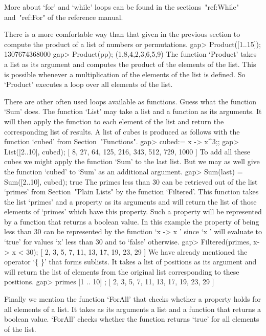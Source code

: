More about `for' and `while' loops can be found in the
sections~"ref:While" and~"ref:For" of the reference manual.


There is a more comfortable way than that given in the previous section to
compute the product of a list of numbers or permutations.
\beginexample
gap> Product([1..15]);
1307674368000
gap> Product(pp);
(1,8,4,2,3,6,5,9)
\endexample
The function  `Product'  takes a  list as  its argument and computes  the
product  of  the  elements  of the  list.   This  is possible whenever  a
multiplication of  the elements of the list is defined.  So  `Product' 
executes a loop over all elements of the list.

There are other often used loops available as functions.   Guess what the
function `Sum' does.  The function `List' may  take a list and a function
as its arguments.  It will then apply the function to each element of the
list  and return  the corresponding list of results.   A list of cubes is
produced as follows with the function `cubed' from Section~"Functions".
\beginexample
gap> cubed:= x -> x^3;;
gap> List([2..10], cubed);
[ 8, 27, 64, 125, 216, 343, 512, 729, 1000 ]
\endexample
To add all these cubes  we might apply the  function  `Sum' to  the  last
list.  But we may  as well  give the  function  `cubed' to  `Sum'  as  an
additional argument.
\beginexample
gap> Sum(last) = Sum([2..10], cubed);
true
\endexample
The  primes less than 30 can  be retrieved out  of the list `primes' from
Section~"Plain Lists" by the function `Filtered'. This function takes the
list `primes' and a property as its arguments and will return the list of
those elements of `primes' which have this property. Such a property will
be represented  by  a function  that  returns  a boolean  value. In  this
example the property  of  being less than  30 can be represented  by  the
function `x  -> x ' since `x ' will evaluate to `true'  for
values `x' less than 30 and to `false' otherwise.
\beginexample
gap> Filtered(primes, x-> x < 30);
[ 2, 3, 5, 7, 11, 13, 17, 19, 23, 29 ]
\endexample
We have already  mentioned the operator `\{  \}' that  forms sublists. It
takes a  list of positions  as its argument  and will return  the list of
elements from the original list corresponding to these positions.
\beginexample
gap> primes{ [1 .. 10] };
[ 2, 3, 5, 7, 11, 13, 17, 19, 23, 29 ]
\endexample

Finally we mention the function `ForAll' that checks whether a property
holds for all elements of a list. It takes as its arguments  a list and a 
function that returns a boolean value. `ForAll' checks whether the
function returns `true' for all elements of the list.

